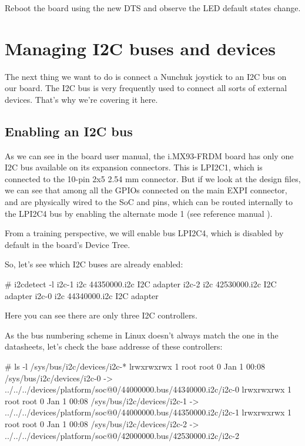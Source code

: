 Reboot the board using the new DTS and observe the LED default states
change.

\section{Managing I2C buses and devices}

The next thing we want to do is connect a Nunchuk joystick
to an I2C bus on our board. The I2C bus is very frequently used
to connect all sorts of external devices. That's why we're covering
it here.

\subsection{Enabling an I2C bus}

As we can see in the board user manual, the i.MX93-FRDM board has
only one I2C bus available on its expansion connectors. This is LPI2C1,
which is connected to the 10-pin 2x5 2.54 mm connector. But if we look
at the design files, we can see that among all the GPIOs connected on the main
EXPI connector,  and  are physically
wired to the SoC  and  pins, which can be routed
internally to the LPI2C4 bus by enabling the alternate mode 1 (see reference
manual ).

From a training perspective, we will enable bus LPI2C4, which is
disabled by default in the board's Device Tree.

So, let's see which I2C buses are already enabled:

\begin{bashinput}
# i2cdetect -l
i2c-1	i2c       	44350000.i2c                    	I2C adapter
i2c-2	i2c       	42530000.i2c                    	I2C adapter
i2c-0	i2c       	44340000.i2c                    	I2C adapter

\end{bashinput}

Here you can see there are only three I2C controllers.

As the bus numbering scheme in Linux doesn't always match the one
in the datasheets, let's check the base addresse of these controllers:

\begin{bashinput}
# ls -l /sys/bus/i2c/devices/i2c-*
lrwxrwxrwx    1 root     root             0 Jan  1 00:08 /sys/bus/i2c/devices/i2c-0 -> ../../../devices/platform/soc@0/44000000.bus/44340000.i2c/i2c-0
lrwxrwxrwx    1 root     root             0 Jan  1 00:08 /sys/bus/i2c/devices/i2c-1 -> ../../../devices/platform/soc@0/44000000.bus/44350000.i2c/i2c-1
lrwxrwxrwx    1 root     root             0 Jan  1 00:08 /sys/bus/i2c/devices/i2c-2 -> ../../../devices/platform/soc@0/42000000.bus/42530000.i2c/i2c-2

\end{bashinput}

